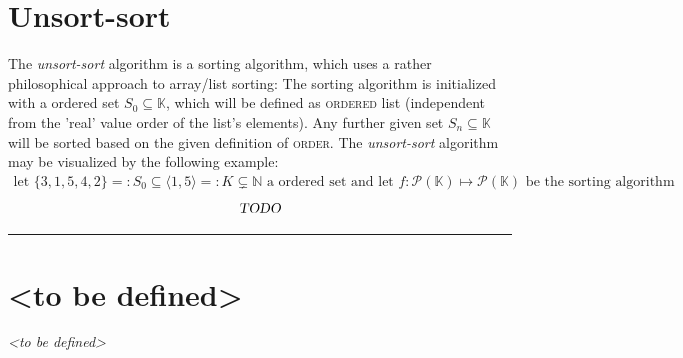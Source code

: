 \documentclass[pdftex,12pt,a4paper]{report}
\begin{document}
    \section{Unsort-sort}
    The \emph{unsort-sort} algorithm is a sorting algorithm, which uses a rather philosophical approach to array/list sorting:
    \newline
    The sorting algorithm is initialized with a ordered set $ S_0 \subseteq \mathbb{K} $, which will be defined as \textsc{ordered} list (independent from the 'real' value order of the list's elements). Any further given set $ S_n \subseteq \mathbb{K} $ will be sorted based on the given definition of \textsc{order}.
    \newline
    The \emph{unsort-sort} algorithm may be visualized by the following example:
    \begin{equation*}
        \begin{aligned}
            \text{let } \{3,1,5,4,2\} =: S_0 \subseteq \langle 1,5 \rangle =: K \subsetneq \mathbb{N} \text{ a ordered set and let }
            f : \mathcal{P}(\mathbb{K}) \mapsto \mathcal{P}(\mathbb{K}) \text{ be the sorting algorithm}
        \end{aligned}
    \end{equation*}
    \begin{equation*}
        \begin{aligned}
            \textsl{TODO}
        \end{aligned}
    \end{equation*}
    \vspace{5mm} \hrule
    \section{<to be defined>}
    \textsl{<to be defined>}
\end{document}
